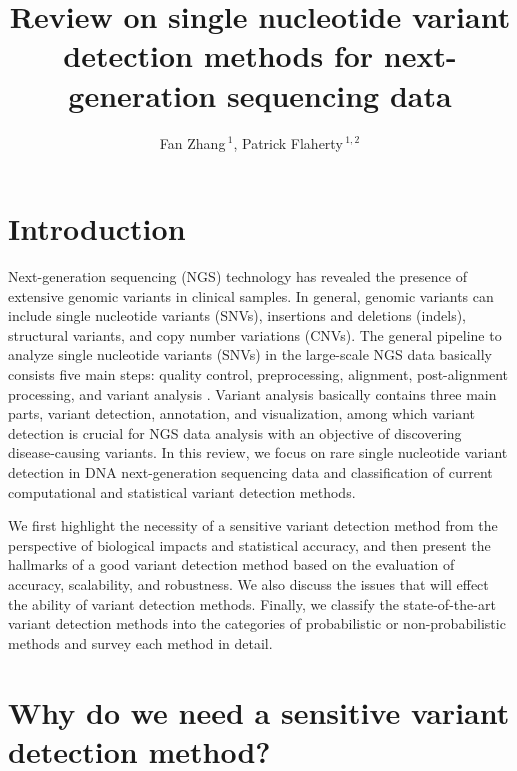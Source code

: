 \documentclass[11pt,reqno]{amsart}
\title[Reveiw on RVD Methods]{Review on single nucleotide variant detection methods for next-generation sequencing data}
\author[F. Zhang AND P. Flaherty]{Fan Zhang\,$^{1}$, Patrick Flaherty\,$^{1,2}$}
\begin{document}
\maketitle

\section{Introduction}

Next-generation sequencing (NGS) technology has revealed the presence of extensive genomic variants in clinical samples.
In general, genomic variants can include single nucleotide variants (SNVs), insertions and deletions (indels), structural variants, and copy number variations (CNVs).
The general pipeline to analyze single nucleotide variants (SNVs) in the large-scale NGS data basically consists five main steps: quality control, preprocessing, alignment, post-alignment processing, and variant analysis \citep{Bao2014}.
Variant analysis basically contains three main parts, variant detection, annotation, and visualization, among which variant detection is crucial for NGS data analysis with an objective of discovering disease-causing variants.
In this review, we focus on rare single nucleotide variant detection in DNA next-generation sequencing data and classification of current computational and statistical variant detection methods.

We first highlight the necessity of a sensitive variant detection method from the perspective of biological impacts and statistical accuracy,
and then present the hallmarks of a good variant detection method based on the evaluation of accuracy, scalability, and robustness.
We also discuss the issues that will effect the ability of variant detection methods.
Finally, we classify the state-of-the-art variant detection methods into the categories of probabilistic or non-probabilistic methods and survey each method in detail.


\section{Why do we need a sensitive variant detection method?}
\end{document}
